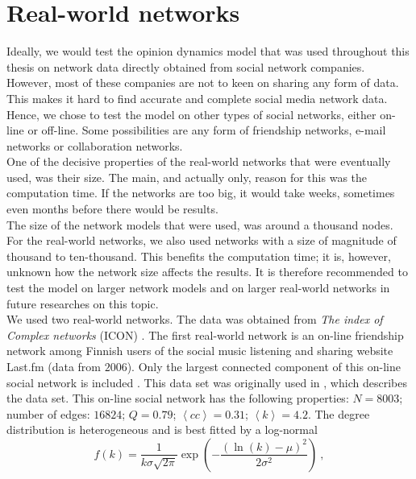 \documentclass[11 pt , letterpaper , twoside , openright]{book}
\begin{document}
\section{Real-world networks}\label{realnetwork}

Ideally, we would test the opinion dynamics model that was used throughout this thesis on network data directly obtained from social network companies. However, most of these companies are not to keen on sharing any form of data. This makes it hard to find accurate and complete social media network data. Hence, we chose to test the model on other types of social networks, either on-line or off-line. Some possibilities are any form of friendship networks, e-mail networks or collaboration networks. \\
\newline
One of the decisive properties of the real-world networks that were eventually used, was their size. The main, and actually only, reason for this was the computation time. If the networks are too big, it would take weeks, sometimes even months before there would be results.\\
\newline
The size of the network models that were used, was around a thousand nodes. For the real-world networks, we also used networks with a size of magnitude of thousand to ten-thousand. This benefits the computation time; it is, however, unknown how the network size affects the results. It is therefore recommended to test the model on larger network models and on larger real-world networks in future researches on this topic. \\
\newline
We used two real-world networks. The data was obtained from \textit{The index of Complex networks} (ICON) \cite{ICON}. The first real-world network is an on-line friendship network among Finnish users of the social music listening and sharing website Last.fm (data from $2006$). Only the largest connected component of this on-line social network is included \cite{ICON}. This data set was originally used in \cite{Toivonen2009}, which describes the data set. This on-line social network has the following properties: $N = 8003$; number of edges: $16824$; $Q = 0.79$; $\left<cc\right> = 0.31$; $\left<k\right> = 4.2$. The degree distribution is heterogeneous and is best fitted by a log-normal
\begin{equation}
	f(k) = \frac{1}{k \sigma \sqrt{2\pi}} \exp(-\frac{(\ln(k) - \mu)^2}{2 \sigma^2})\ ,
\end{equation}
\end{document}
